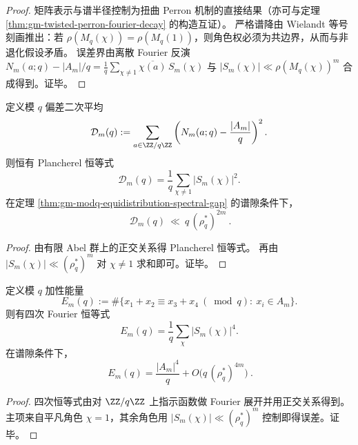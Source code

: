 \begin{proof}
矩阵表示与谱半径控制为扭曲 Perron 机制的直接结果（亦可与定理 \ref{thm:gm-twisted-perron-fourier-decay} 的构造互证）。
严格谱降由 Wielandt 等号刻画推出：若 \(\rho(M_q(\chi))=\rho(M_q(1))\)，则角色权必须为共边界，从而与非退化假设矛盾。
误差界由离散 Fourier 反演
\(
N_m(a;q)-|A_m|/q=\frac{1}{q}\sum_{\chi\ne 1}\overline{\chi(a)}\,S_m(\chi)
\)
与 \(|S_m(\chi)|\ll \rho(M_q(\chi))^m\) 合成得到。证毕。
\end{proof}

\begin{proposition}\label{prop:gm-chebotarev-plancherel-l2}
定义模 \(q\) 偏差二次平均
\[
\mathcal{D}_m(q):=\sum_{a\in\ZZ/q\ZZ}\left(N_m(a;q)-\frac{|A_m|}{q}\right)^2.
\]
则恒有 Plancherel 恒等式
\[
\mathcal{D}_m(q)=\frac{1}{q}\sum_{\chi\ne 1}|S_m(\chi)|^2.
\]
在定理 \ref{thm:gm-modq-equidistribution-spectral-gap} 的谱隙条件下，
\[
\boxed{\ \mathcal{D}_m(q)\ \ll\ q\,(\rho_q^\ast)^{2m}\ }.
\]
\end{proposition}

\begin{proof}
由有限 Abel 群上的正交关系得 Plancherel 恒等式。
再由 \(|S_m(\chi)|\ll (\rho_q^\ast)^m\) 对 \(\chi\ne 1\) 求和即可。证毕。
\end{proof}

\begin{proposition}\label{prop:gm-modq-additive-energy-main-error}
定义模 \(q\) 加性能量
\[
E_m(q):=\#\{x_1+x_2\equiv x_3+x_4\ (\bmod q):\ x_i\in A_m\}.
\]
则有四次 Fourier 恒等式
\[
E_m(q)=\frac{1}{q}\sum_{\chi}|S_m(\chi)|^4.
\]
在谱隙条件下，
\[
\boxed{\ E_m(q)=\frac{|A_m|^4}{q}+O\!\bigl(q\,(\rho_q^\ast)^{4m}\bigr)\ }.
\]
\end{proposition}

\begin{proof}
四次恒等式由对 \(\ZZ/q\ZZ\) 上指示函数做 Fourier 展开并用正交关系得到。
主项来自平凡角色 \(\chi=1\)，其余角色用 \(|S_m(\chi)|\ll (\rho_q^\ast)^m\) 控制即得误差。证毕。
\end{proof}

